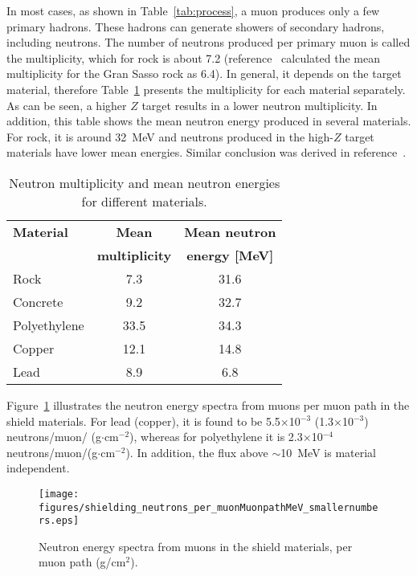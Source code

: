 In most cases, as shown in Table~\ref{tab:process}, a muon produces only a few primary hadrons. 
These hadrons can generate showers of secondary hadrons, including neutrons. The number of
neutrons produced per primary muon is called the multiplicity, which for rock is about 7.2 (reference~\cite{wang} calculated the mean multiplicity for the Gran Sasso rock as 6.4).
In general, it depends on the target material, therefore
Table~\ref{tab:multi-Emean} presents the multiplicity for each material separately.
As can be seen, a higher $Z$ target results in a lower neutron multiplicity.
In addition, this table shows the mean neutron energy produced in
several materials. For rock, it is around 32~MeV and 
neutrons produced in the high-$Z$ target materials have lower 
mean energies. Similar conclusion was derived in reference~\cite{vito}. 

\begin{table}[ht]
\centering
\caption{Neutron multiplicity and mean neutron energies for different materials.}
\label{tab:multi-Emean}
\vspace{0.3cm}
\begin{tabular}{lcc}
\hline
\bf{Material}  & \bf{Mean}  & \bf{Mean neutron}   \\
          & \bf{multiplicity}& \bf{energy [MeV]}\\
\hline
Rock & 7.3 & 31.6\\
Concrete & 9.2 & 32.7\\
Polyethylene & 33.5 & 34.3 \\
Copper & 12.1 & 14.8 \\
Lead &  8.9 & 6.8\\
\hline
\end{tabular}
\end{table}

Figure~\ref{n-per-muon} illustrates the neutron energy spectra from muons per muon
path in the shield materials.
For lead (copper), it is found to be 5.5$\times$10$^{-3}$ (1.3$\times$10$^{-3}$)
neutrons/muon/ (g$\cdot$cm$^{-2}$), whereas for polyethylene it is 2.3$\times$10$^{-4}$
neutrons/muon/(g$\cdot$cm$^{-2}$). In addition, the flux above $\sim$10~MeV is material independent.


\begin{figure}[h!]
\begin{center}
\texttt{[image: figures/shielding\_neutrons\_per\_muonMuonpathMeV\_smallernumbers.eps]}
\end{center}
\caption{Neutron energy spectra from muons in the shield materials, per
muon path (g/cm$^2$).}
\label{n-per-muon}
\end{figure}

